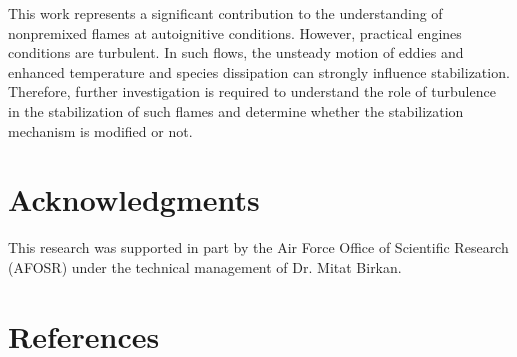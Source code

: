 \documentclass[review,3p,times]{elsarticle}
\begin{document}
\textcolor{Rv1}{This work represents a significant contribution to the understanding of nonpremixed flames at autoignitive conditions.  However, practical engines conditions are turbulent.  In such flows, the unsteady motion of eddies and enhanced temperature and species dissipation can strongly influence stabilization.  Therefore, further investigation is required to understand the role of turbulence in the stabilization of such flames and determine whether the stabilization mechanism is modified or not.} 



\section*{Acknowledgments}
This research was supported in part by the Air Force Office of Scientific Research (AFOSR) under the technical management of Dr. Mitat Birkan.


\section*{References}



\renewcommand{\thefigure}{\arabic{figure}}
\renewcommand{\thetable}{\arabic{table}}
\end{document}
